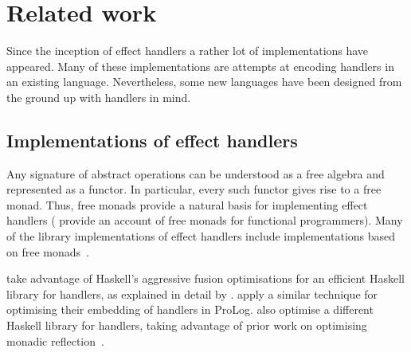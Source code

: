\documentclass[12pt,mscres,cdtppar,twoside,openright,logo,rightchapter,normalheadings]{infthesis}
\theoremstyle{definition}
\begin{document}


\section{Related work}
\label{sec:related-work}

Since the inception of effect handlers a rather lot of implementations
have appeared. Many of these implementations are attempts at encoding
handlers in an existing language. Nevertheless, some new languages
have been designed from the ground up with handlers in mind.

\subsection{Implementations of effect handlers}
Any signature of abstract operations can be understood as a free
algebra and represented as a functor. In particular, every such
functor gives rise to a free monad. Thus, free monads provide a
natural basis for implementing effect handlers (\citet{Swierstra2008b}
provide an account of free monads for functional programmers).  Many
of the library implementations of effect handlers include
implementations based on free monads~\citep{Kammar2013, Kiselyov2013,
  Kiselyov2015, Brady2013, Wu2014}.


\citet{Kammar2013} take advantage of Haskell's aggressive fusion
optimisations for an efficient Haskell library for handlers, as
explained in detail by \citet{Wu2015}. \citet{Saleh2016} apply a
similar technique for optimising their embedding of handlers in
ProLog. \citet{Kiselyov2015} also optimise a different Haskell library
for handlers, taking advantage of prior work on optimising monadic
reflection~\citep{Ploeg2014}.
\end{document}

